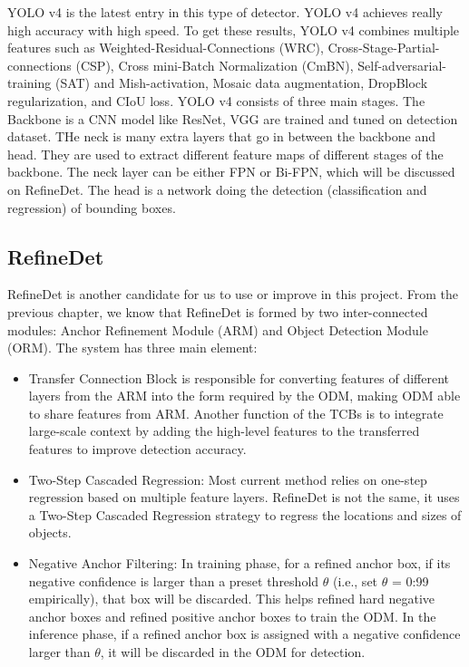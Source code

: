 YOLO v4 is the latest entry in this type of detector. YOLO v4 achieves really high accuracy with high speed. To get these results, YOLO v4 combines multiple features such as Weighted-Residual-Connections (WRC), Cross-Stage-Partial-connections (CSP), Cross mini-Batch Normalization (CmBN), Self-adversarial-training (SAT) and Mish-activation, Mosaic data augmentation, DropBlock regularization, and CIoU loss. 
YOLO v4 consists of three main stages. The Backbone is a CNN model like ResNet, VGG are trained and tuned on detection dataset. THe neck is many extra layers that go in between the backbone and head. They are used to extract different feature maps of different stages of the backbone. The neck layer can be either FPN or Bi-FPN, which will be discussed on RefineDet. The head is a network doing the detection (classification and regression) of bounding boxes.

\subsection{RefineDet}
RefineDet is another candidate for us to use or improve in this project. From the previous chapter, we know that RefineDet is formed by two inter-connected modules: Anchor Refinement Module (ARM) and Object Detection Module (ORM). The system has three main element:
\begin{itemize}
    \item Transfer Connection Block is responsible for converting features of different layers from the ARM into the form required by the ODM, making ODM able to share features from ARM. Another function of the TCBs is to integrate large-scale context by adding the high-level features to the transferred features to improve detection accuracy. 
    \item Two-Step Cascaded Regression: Most current method relies on one-step regression based on multiple feature layers. RefineDet is not the same, it uses a Two-Step Cascaded Regression strategy to regress the locations and sizes of objects.
    \item Negative Anchor Filtering: In training phase, for a refined anchor box, if its negative confidence is larger than a preset threshold $\theta$ (i.e., set $\theta$ = 0:99 empirically), that box will be discarded. This helps refined hard negative anchor boxes and refined positive anchor boxes to train the ODM. In the inference phase, if a refined anchor box is assigned with a negative confidence larger than $\theta$, it will be discarded in the ODM for detection.
\end{itemize}


